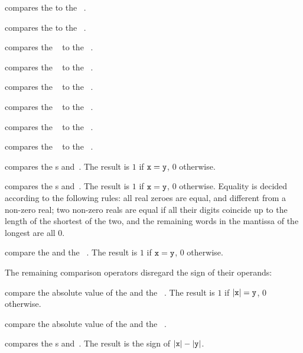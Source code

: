  compares the   to the
~.

 compares the   to the
~.

 compares the ~ to the
~.

 compares the ~ to the
~.

 compares the ~ to the
~.

 compares the ~ to the
~.

 compares the ~ to the
~.

 compares the ~ to the
~.

 compares the s  and~.
The result is $1$ if ${\tt x} = {\tt y}$, $0$ otherwise.

 compares the s  and~.
The result is $1$ if ${\tt x} = {\tt y}$, $0$ otherwise. Equality is decided
according to the following rules: all real zeroes are equal, and
different from a non-zero real; two non-zero reals are equal if all their
digits coincide up to the length of the shortest of the two, and the
remaining words in the mantissa of the longest are all $0$.


 compare the   and
the ~. The result is $1$ if ${\tt x} = {\tt y}$, $0$ otherwise.

The remaining comparison operators disregard the sign of their operands:


 compare the absolute value of the
  and the ~. The result is $1$ if
$|{\tt x}| = {\tt y}$, $0$ otherwise.


 compare the absolute value of the
  and the ~.

 compares the s  and~.
The result is the sign of $|{\tt x}| - |{\tt y}|$.

